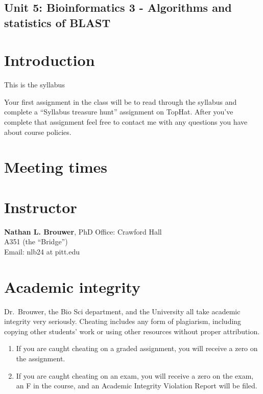 \documentclass[
]{book}
\providecommand{\tightlist}{%
  \setlength{\itemsep}{0pt}\setlength{\parskip}{0pt}}
\begin{document}
\hypertarget{unit-5-bioinformatics-3---algorithms-and-statistics-of-blast}{%
\section{Unit 5: Bioinformatics 3 - Algorithms and statistics of BLAST}\label{unit-5-bioinformatics-3---algorithms-and-statistics-of-blast}}

\hypertarget{intro}{%
\chapter{Introduction}\label{intro}}

This is the syllabus

Your first assignment in the class will be to read through the syllabus and complete a ``Syllabus treasure hunt'' assignment on TopHat. After you've complete that assignment feel free to contact me with any questions you have about course policies.

\hypertarget{meeting-times}{%
\chapter{Meeting times}\label{meeting-times}}

\hypertarget{instructor}{%
\chapter{Instructor}\label{instructor}}

\textbf{Nathan L. Brouwer}, PhD
Office: Crawford Hall\\
A351 (the ``Bridge'')\\
Email: nlb24 at pitt.edu

\hypertarget{academic-integrity}{%
\chapter{Academic integrity}\label{academic-integrity}}

Dr.~Brouwer, the Bio Sci department, and the University all take academic integrity very seriously. Cheating includes any form of plagiarism, including copying other students' work or using other resources without proper attribution.

\begin{enumerate}
\def\labelenumi{\arabic{enumi}.}
\tightlist
\item
  If you are caught cheating on a graded assignment, you will receive a zero on the assignment.
\item
  If you are caught cheating on an exam, you will receive a zero on the exam, an F in the course, and an Academic Integrity Violation Report will be filed.
\end{enumerate}
\end{document}
